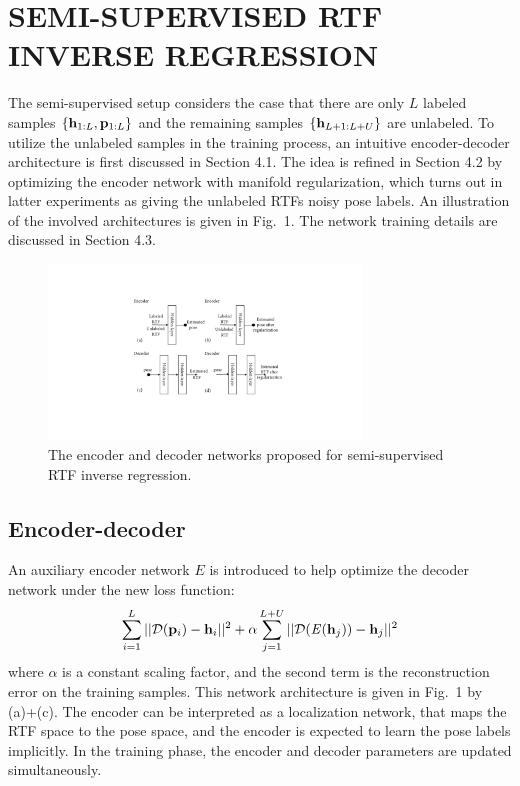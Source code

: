 \documentclass{article}
\begin{document}
\section{SEMI-SUPERVISED RTF INVERSE REGRESSION}

The semi-supervised setup considers the case that there are only $L$ labeled samples $\{{\bf h}_{1:L}, {\bf p}_{1:L}\}$ and the remaining samples $\{{\bf h}_{L+1:L+U}\}$ are unlabeled. To utilize the unlabeled samples in the training process, an intuitive encoder-decoder architecture is first discussed in Section 4.1. The idea is refined in Section 4.2 by optimizing the encoder network with manifold regularization, which turns out in latter experiments as giving the unlabeled RTFs noisy pose labels. An illustration of the involved architectures is given in Fig.~1. The network training details are discussed in Section 4.3.

\begin{figure}[tb]
    \centering
    \centerline{\includegraphics[width=8.3cm]{fig1_nn.pdf}}
    \caption{The encoder and decoder networks proposed for semi-supervised RTF inverse regression.}
    \label{fig1}
\end{figure}

\subsection{Encoder-decoder}

An auxiliary encoder network $\mathit{E}$ is introduced to help optimize the decoder network under the new loss function:
\begin{equation}\label{eq:lossed}
\sum_{i=1}^{L}||\mathcal{D}({\bf p}_i)-{\bf h}_i||^2 + \alpha \sum_{j=1}^{L+U}||\mathcal{D}(\mathit{E}({\bf h}_j))-{\bf h}_j||^2
\end{equation}
where $\alpha$ is a constant scaling factor, and the second term is the reconstruction error on the training samples. This network architecture is given in Fig.~1 by (a)+(c). The encoder can be interpreted as a localization network, that maps the RTF space to the pose space, and the encoder is expected to learn the pose labels implicitly. In the training phase, the encoder and decoder parameters are updated simultaneously.
\end{document}

